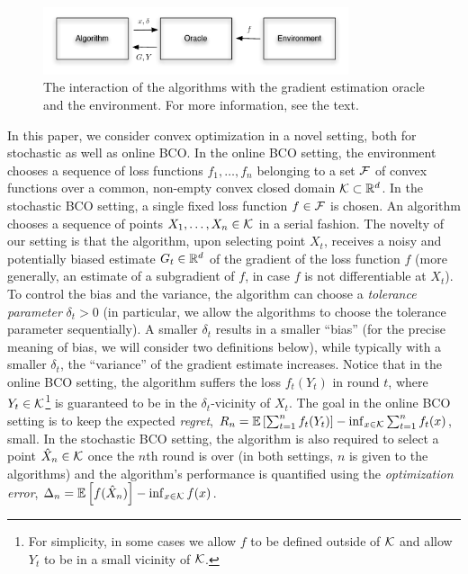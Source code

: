 \begin{figure}
\begin{center}
\includegraphics[width=0.8\textwidth]{../figs/oracle}
\end{center}
\caption{The interaction of the algorithms with the gradient estimation oracle and the environment. For more information, see the text. \vspace{-0.3cm}}
\label{fig:oracle}
\end{figure}

In this paper, we consider convex optimization in a novel setting, both for stochastic as well as online BCO.
In the online BCO setting, the environment chooses a sequence of loss functions $f_1,\dots,f_n$ belonging to a set $\mathcal{F}$ of convex functions over a common, non-empty convex closed domain $\mathcal{K}\subset \mathbb{R}^d$.
In the stochastic BCO setting, a single fixed loss function $f\in \mathcal{F}$ is chosen.
An algorithm chooses a sequence of points $X_1,\dots,X_n\in \mathcal{K}$ in a serial fashion.
The novelty of our setting is that the algorithm, upon selecting point $X_t$, receives
a noisy and potentially biased estimate $G_t\in \mathbb{R}^d$
of the gradient of the loss function $f$
(more generally, an estimate of a subgradient of $f$, in case $f$ is not differentiable at $X_t$).
To control the bias and the variance, the algorithm can choose a \emph{tolerance parameter} $\delta_t>0$
(in particular, we allow the algorithms to choose the tolerance parameter sequentially).
A smaller $\delta_t$ results in a smaller ``bias'' (for the precise meaning of bias, we will consider two definitions below), while typically with a smaller $\delta_t$, the ``variance'' of the gradient estimate increases.
Notice that in the online BCO setting, the algorithm suffers the loss $f_t(Y_t)$ in round $t$, where $Y_t\in \mathcal{K}$\footnote{For simplicity, in some cases we allow $f$ to be defined outside of $\mathcal{K}$ and allow $Y_t$ to be in a small vicinity of $\mathcal{K}$.} is guaranteed to be in the $\delta_t$-vicinity of $X_t$.
The goal in the online BCO setting is to keep the expected \emph{regret},
	$R_n =\mathbb{E}\left[ \sum_{t=1}^n f_t(Y_t)\right] - \inf_{x\in \mathcal{K}} \sum_{t=1}^n f_t(x)$,
small.
In the stochastic BCO setting, the algorithm is also required to select a point $\hat{X}_n\in \mathcal{K}$ once
the $n$th round is over (in both settings, $n$ is given to the algorithms)
and the algorithm's performance is quantified using the \emph{optimization error},
$\Delta_n = \mathbb{E}\left[f(\hat{X}_n)\right] - \inf_{x\in \mathcal{K}} f(x) $.

